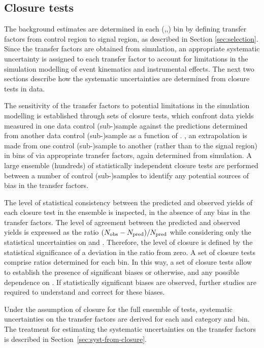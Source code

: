 \subsection{Closure tests}
\label{sec:closure-tests-desc}
\label{sec:bkgdnorm-syst}

The background estimates are determined in each (\nb,\njet,\scalht) bin by
defining transfer factors from control region to signal region, as
described in Section \ref{sec:selection}. Since the transfer factors
are obtained from simulation, an appropriate systematic uncertainty is
assigned to each transfer factor to account for limitations in the
simulation modelling of event kinematics and instrumental effects. The
next two sections describe how the systematic uncertainties are
determined from closure tests in data.

The sensitivity of the transfer factors to potential limitations in
the simulation modelling is established through sets of closure tests,
which confront data yields measured in one data control (sub-)sample
against the predictions determined from another data control
(sub-)sample as a function of \scalht. \ie, an extrapolation is made
from one control (sub-)sample to another (rather than to the signal
region) in bins of \scalht via appropriate transfer factors, again
determined from simulation. A large ensemble (\ie hundreds) of
statistically independent closure tests are performed between a number
of control (sub-)samples to identify any potential sources of bias in
the transfer factors.

The level of statistical consistency between the predicted and
observed yields of each closure test in the ensemble is inspected, in
the absence of any bias in the transfer factors. The level of
agreement between the predicted and observed yields is expressed as
the ratio $(N_{\textrm{obs}} - N_{\textrm{pred}})/N_{\textrm{pred}}$ while considering only the
statistical uncertainties on \npre and \nobs. Therefore, the level of
closure is defined by the statistical significance of a deviation in
the ratio from zero. A set of closure tests comprise ratios determined
for each \scalht bin. In this way, a set of closure tests allow to
establish the presence of significant biases or otherwise, and any
possible dependence on \scalht. If statistically significant biases
are observed, further studies are required to understand and correct
for these biases.

Under the assumption of closure for the full ensemble of tests,
systematic uncertainties on the transfer factors are derived for each
\njet and \nb category and \scalht bin. The treatment for
estimating the systematic uncertainties on the transfer factors is
described in Section~\ref{sec:syst-from-closure}.

